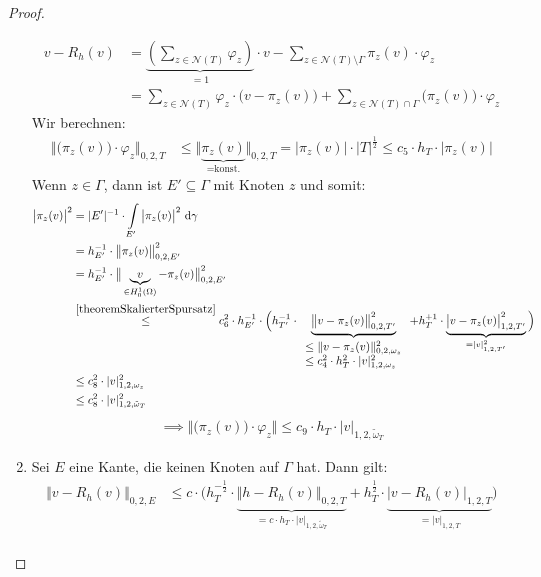 \begin{proof}
\begin{enumerate}[label=\roman*)]
		\begin{align*}
			v-R_h(v)
			&=\underbrace{\left(\sum\limits_{z\in\mathcal{N}(T)}\varphi_z\right)}_{=1}\cdot v-\sum\limits_{z\in\mathcal{N}(T)\setminus\Gamma}\pi_z(v)\cdot\varphi_z\\
			&=\sum\limits_{z\in\mathcal{N}(T)}\varphi_z\cdot\big(v-\pi_z(v)\big)+\sum\limits_{z\in\mathcal{N}(T)\cap\Gamma}\big(\pi_z(v)\big)\cdot\varphi_z
		\end{align*}
		Wir berechnen:
		\begin{align*}
			\Big\Vert(\pi_z(v)\big)\cdot\varphi_z\Big\Vert_{0,2,T}
			&\leq
			\big\Vert\underbrace{\pi_z(v)}_{=\text{konst.}}\big\Vert_{0,2,T}
			=\big|\pi_z(v)\big|\cdot|T|^{\frac{1}{2}}
			\leq c_5\cdot h_T\cdot\big|\pi_z(v)\big|
		\end{align*}
		Wenn $z\in\Gamma$, dann ist $E'\subseteq\Gamma$ mit Knoten $z$ und somit:
		\begin{align*}
			\big|\pi_z(v)\big|^2
			&=|E'|^{-1}\cdot\int\limits_{E'}\big|\pi_z(v)\big|^2\text{ d}\gamma\\
			&=h_{E'}^{-1}\cdot\big\Vert\pi_z(v)\big\Vert^2_{0,2,E'}\\
			&=h_{E'}^{-1}\cdot\big\Vert\underbrace{v}_{\in H_0^1(\Omega)}-\pi_z(v)\big\Vert^2_{0,2,E'}\\
			&\stackrel{\ref{theoremSkalierterSpursatz}}{\leq}
			c_6^2\cdot h_{E'}^{-1}\cdot\Big(h_{T'}^{-1}\cdot
			\underbrace{\big\Vert v-\pi_z(v)\big\Vert_{0,2,T'}^2}
			_{
			\begin{array}{l}
				\leq\Vert v-\pi_z(v)\Vert^2_{0,2,\omega_z}\\
				\leq c_4^2\cdot h_T^2\cdot|v|^2_{1,2,\omega_z}
			\end{array}}+h_T^{+1}\cdot\underbrace{\big|v-\pi_z(v)\big|^2_{1,2,T'}}_{=|v|^2_{1,2,T'}}\Big)\\
			&\leq
			c_8^2\cdot|v|^2_{1,2,\omega_z} \\
			&\leq
			c_8^2\cdot|v|_{1,2,\tilde{\omega}_T}^2\\
		\end{align*}
		\begin{align*}
			\implies \Big\Vert\big(\pi_z(v)\big)\cdot\varphi_z\Big\Vert\leq c_9\cdot h_T\cdot|v|_{1,2,\tilde{\omega}_T}
		\end{align*}
		\item  Sei $E$ eine Kante, die keinen Knoten auf $\Gamma$ hat. Dann gilt:
		\begin{align*}
			\big\Vert v-R_h(v)\big\Vert_{0,2,E}
			&\leq
			c\cdot\Big(h_T^{-\frac{1}{2}}\cdot\underbrace{\big\Vert h-R_h(v)\big\Vert_{0,2,T}}_{=c\cdot h_T\cdot|v|_{1,2,\tilde{\omega}_T}}+h_T^{\frac{1}{2}}\cdot\underbrace{\big|v-R_h(v)\big|_{1,2,T}}_{=|v|_{1,2,T}}\Big)\\

\end{align*}
\end{enumerate}
\end{proof}

